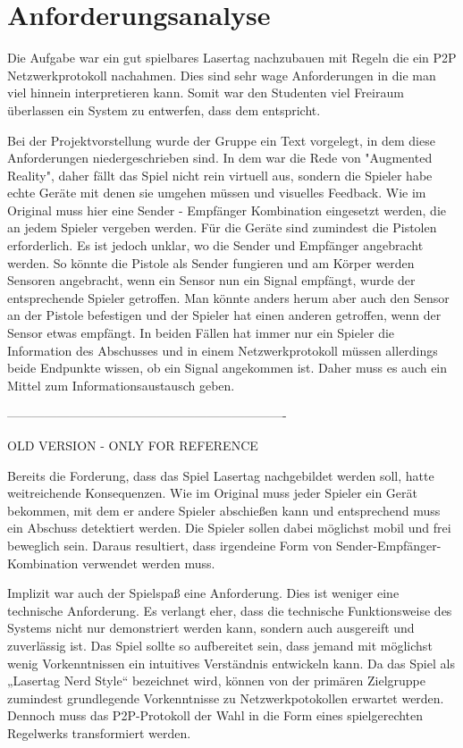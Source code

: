 \section{Anforderungsanalyse}

Die Aufgabe war ein gut spielbares Lasertag nachzubauen mit Regeln die ein
P2P Netzwerkprotokoll nachahmen. Dies sind sehr wage Anforderungen in die man
viel hinnein interpretieren kann. Somit war den Studenten viel Freiraum
überlassen ein System zu entwerfen, dass dem entspricht.

Bei der Projektvorstellung wurde der Gruppe ein Text vorgelegt, in dem diese
Anforderungen niedergeschrieben sind. In dem war die Rede von 
"Augmented Reality", daher fällt das Spiel nicht rein virtuell aus, sondern
die Spieler habe echte Geräte mit denen sie umgehen müssen und visuelles
Feedback. Wie im Original muss hier eine Sender - Empfänger Kombination
eingesetzt werden, die an jedem Spieler vergeben werden. Für die Geräte sind
zumindest die Pistolen erforderlich. Es ist jedoch unklar, wo die Sender und
Empfänger angebracht werden. So könnte die Pistole als Sender fungieren und
am Körper werden Sensoren angebracht, wenn ein Sensor nun ein Signal empfängt,
wurde der entsprechende Spieler getroffen. Man könnte anders herum aber auch
den Sensor an der Pistole befestigen und der Spieler hat einen anderen
getroffen, wenn der Sensor etwas empfängt. In beiden Fällen hat immer nur ein
Spieler die Information des Abschusses und in einem Netzwerkprotokoll müssen
allerdings beide Endpunkte wissen, ob ein Signal angekommen ist. Daher muss
es auch ein Mittel zum Informationsaustausch geben.

-------------------------------------------------------------------

OLD VERSION - ONLY FOR REFERENCE

Bereits die Forderung, dass das Spiel Lasertag nachgebildet werden soll, hatte weitreichende
Konsequenzen.
Wie im Original muss jeder Spieler ein Gerät bekommen, mit dem er andere Spieler abschießen kann und
entsprechend muss ein Abschuss detektiert werden.
Die Spieler sollen dabei möglichst mobil und frei beweglich sein.
Daraus resultiert, dass irgendeine Form von Sender-Empfänger-Kombination verwendet werden muss.

Implizit war auch der Spielspaß eine Anforderung.
Dies ist weniger eine technische Anforderung.
Es verlangt eher, dass die technische Funktionsweise des Systems nicht nur demonstriert werden kann,
sondern auch ausgereift und zuverlässig ist.
Das Spiel sollte so aufbereitet sein, dass jemand mit möglichst wenig Vorkenntnissen ein intuitives
Verständnis entwickeln kann.
Da das Spiel als „Lasertag Nerd Style“ bezeichnet wird, können von der primären Zielgruppe zumindest
grundlegende Vorkenntnisse zu Netzwerkpotokollen erwartet werden. Dennoch muss das P2P-Protokoll der
Wahl in die Form eines spielgerechten Regelwerks transformiert werden.

